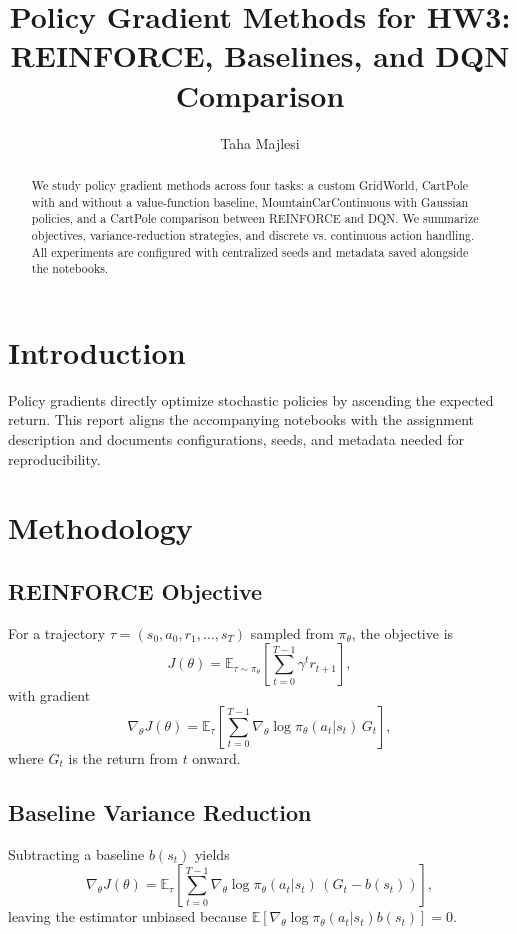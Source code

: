 \documentclass[10pt,conference]{IEEEtran}
\title{Policy Gradient Methods for HW3: REINFORCE, Baselines, and DQN Comparison}
\author{Taha Majlesi}
\begin{document}
\maketitle

\begin{abstract}
We study policy gradient methods across four tasks: a custom GridWorld, CartPole with and without a value-function baseline, MountainCarContinuous with Gaussian policies, and a CartPole comparison between REINFORCE and DQN. We summarize objectives, variance-reduction strategies, and discrete vs. continuous action handling. All experiments are configured with centralized seeds and metadata saved alongside the notebooks.
\end{abstract}

\section{Introduction}
Policy gradients directly optimize stochastic policies by ascending the expected return. This report aligns the accompanying notebooks with the assignment description and documents configurations, seeds, and metadata needed for reproducibility.

\section{Methodology}
\subsection{REINFORCE Objective}
For a trajectory $\tau = (s_0, a_0, r_1, \ldots, s_T)$ sampled from $\pi_\theta$, the objective is
\begin{equation}
J(\theta) = \mathbb{E}_{\tau \sim \pi_\theta}\left[\sum_{t=0}^{T-1} \gamma^t r_{t+1}\right],
\end{equation}
with gradient
\begin{equation}
\nabla_\theta J(\theta)=\mathbb{E}_{\tau}\left[\sum_{t=0}^{T-1} \nabla_\theta \log \pi_\theta(a_t|s_t)\, G_t\right],
\end{equation}
where $G_t$ is the return from $t$ onward.

\subsection{Baseline Variance Reduction}
Subtracting a baseline $b(s_t)$ yields
\begin{equation}
\nabla_\theta J(\theta)=\mathbb{E}_{\tau}\left[\sum_{t=0}^{T-1} \nabla_\theta \log \pi_\theta(a_t|s_t)\, (G_t-b(s_t))\right],
\end{equation}
leaving the estimator unbiased because $\mathbb{E}[\nabla_\theta \log \pi_\theta(a_t|s_t)b(s_t)]=0$.
\end{document}
